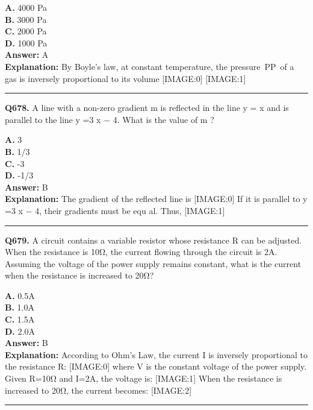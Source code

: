 \documentclass[12pt]{article}
\begin{document}
\textbf{A.} 4000 Pa \\
\textbf{B.} 3000 Pa \\
\textbf{C.} 2000 Pa \\
\textbf{D.} 1000 Pa \\

\textbf{Answer:} A \\
\textbf{Explanation:} By Boyle’s law, at constant temperature, the pressure PP of a gas is inversely proportional to its volume
[IMAGE:0]
[IMAGE:1]

\hrule
\vspace{1em}


\noindent
\textbf{Q678.} A line with a non-zero gradient
m
is reflected in the line
y
=
x
and is parallel to the line
y
=3
x
−
4. What is the value of
m
?



\textbf{A.} 3 \\
\textbf{B.} 1/3 \\
\textbf{C.} -3 \\
\textbf{D.} -1/3 \\

\textbf{Answer:} B \\
\textbf{Explanation:} The gradient of the reflected line is
[IMAGE:0]
If it is parallel to
y
=3
x
−
4, their gradients must be equ
al. Thus,
[IMAGE:1]

\hrule
\vspace{1em}


\noindent
\textbf{Q679.} A circuit contains a variable resistor whose resistance R can be adjusted. When the resistance is 10Ω, the current flowing through the circuit is 2A. Assuming the voltage of the power supply remains constant, what is the current when the resistance is increased to 20Ω?



\textbf{A.} 0.5A \\
\textbf{B.} 1.0A \\
\textbf{C.} 1.5A \\
\textbf{D.} 2.0A \\

\textbf{Answer:} B \\
\textbf{Explanation:} According to Ohm's Law, the current I is inversely proportional to the resistance R:
[IMAGE:0]
where V is the constant voltage of the power supply. Given R=10Ω and I=2A, the voltage is:
[IMAGE:1]
When the resistance is increased to 20Ω, the current becomes:
[IMAGE:2]

\hrule
\vspace{1em}
\end{document}
